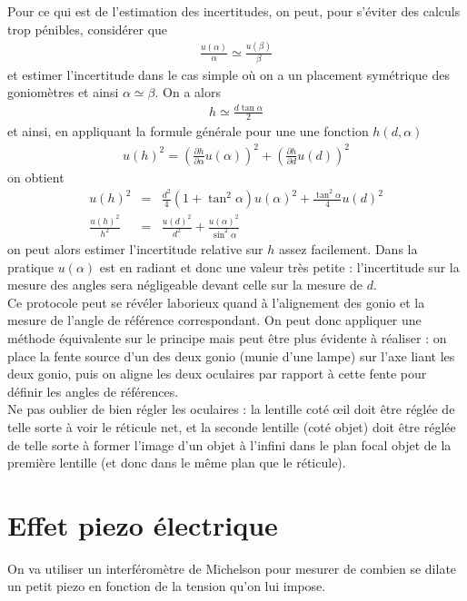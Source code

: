 \documentclass[12pt,prb,aps,epsf]{article}
\begin{document}
Pour ce qui est de l'estimation des incertitudes, on peut, pour s'éviter des calculs trop pénibles, considérer que 
\begin{eqnarray}
\frac{u(\alpha)}{\alpha} \simeq \frac{u(\beta)}{\beta}
\end{eqnarray}
et estimer l'incertitude dans le cas simple où on a un placement symétrique des goniomètres et ainsi $\alpha \simeq \beta$. On a alors 
\begin{eqnarray}
h \simeq \frac{d \tan\alpha}{2}
\end{eqnarray}
et ainsi, en appliquant la formule générale pour une une fonction $h(d, \alpha)$
\begin{eqnarray}
u(h)^2 = \left(\frac{\partial h}{\partial \alpha}u(\alpha)\right)^2 + \left(\frac{\partial h}{\partial d}u(d)\right)^2
\end{eqnarray}
on obtient 
\begin{eqnarray}
u(h)^2 &=& \frac{d^2}{4}(1+\tan^2\alpha)u(\alpha)^2 + \frac{\tan^2\alpha}{4}u(d)^2\\
\frac{u(h)^2}{h^2} &=& \frac{u(d)^2}{d^2} + \frac{u(\alpha)^2}{\sin^2\alpha}
\end{eqnarray}
on peut alors estimer l'incertitude relative sur $h$ assez facilement. Dans la pratique $u(\alpha)$ est en radiant et donc une valeur très petite : l'incertitude sur la mesure des angles sera négligeable devant celle sur la mesure de $d$.\\

Ce protocole peut se révéler laborieux quand à l'alignement des gonio et la mesure de l'angle de référence correspondant. On peut donc appliquer une méthode équivalente sur le principe mais peut être plus évidente à réaliser : on place la fente source d'un des deux gonio (munie d'une lampe) sur l'axe liant les deux gonio, puis on aligne les deux oculaires par rapport à cette fente pour définir les angles de références.\\

Ne pas oublier de bien régler les oculaires :  la lentille coté œil doit être réglée de telle sorte à voir le réticule net, et la seconde lentille (coté objet) doit être réglée de telle sorte à former l'image d'un objet à l'infini dans le plan focal objet de la première lentille (et donc dans le même plan que le réticule). 

\section{Effet piezo électrique}
On va utiliser un interféromètre de Michelson pour mesurer de combien se dilate un petit piezo en fonction de la tension qu'on lui impose.\\
\end{document}
